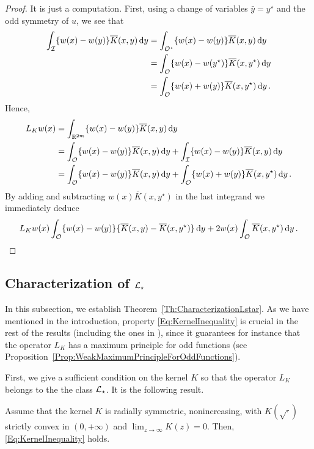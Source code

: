\begin{proof}
	It is just a computation. First,  using a change of variables  $\bar{y} = y^\star$ and the odd symmetry of $u$, we see that
	\begin{align*}
	\int_{\mathcal{I}}  \{w(x) - w(y) \} \overline{K}(x, y)\,\mathrm{d} y &= \int_{\mathcal{O}^\star} \{w(x) - w(y) \}\overline{K}(x, y)\,\mathrm{d} y \\
	&= \int_{\mathcal{O}} \{w(x) - w(y^\star) \}\overline{K}(x, y^\star)\,\mathrm{d} y \\
	&= \int_{\mathcal{O}} \{w(x) + w(y) \}\overline{K}(x, y^\star)\,\mathrm{d} y\,.
	\end{align*}
	Hence,
	\begin{align*}
	L_K w (x) &= \int_{\mathbb{R}^{2m}}  \{w(x) - w(y) \} \overline{K}(x, y)\,\mathrm{d} y \\
	&= \int_{\mathcal{O}}  \{w(x) - w(y) \} \overline{K}(x, y)\,\mathrm{d} y +\int_{\mathcal{I}}  \{w(x) - w(y) \} \overline{K}(x, y)\,\mathrm{d} y \\
	&= \int_{\mathcal{O}} \{w(x) - w(y) \} \overline{K}(x, y) \,\mathrm{d} y +  \int_{\mathcal{O}} \{w(x) + w(y) \} \overline{K}(x, y^\star) \,\mathrm{d} y \,.
	\end{align*}
	By adding and subtracting $w(x)\overline{K}(x, y^\star)$ in the last integrand we immediately deduce
	$$
	L_K w (x) \int_{\mathcal{O}} \{w(x) - w(y) \} \{\overline{K}(x, y) - \overline{K}(x, y^\star)  \} \,\mathrm{d} y +  2 w(x) \int_{\mathcal{O}} \overline{K}(x, y^\star) \,\mathrm{d} y\,.
	$$
\end{proof}

\subsection{Characterization of $\mathcal{L}_\star$}

In this subsection, we establish Theorem~\ref{Th:CharacterizationLstar}. As we have mentioned in the introduction, property \eqref{Eq:KernelInequality} is crucial in the rest of the results (including the ones in \cite{FelipeSanz-Perela:IntegroDifferentialII}), since it guarantees for instance that the operator $L_K$ has a maximum principle for odd functions (see Proposition~\ref{Prop:WeakMaximumPrincipleForOddFunctions}).

First, we give a sufficient condition on the kernel $K$ so that the operator $L_K$ belongs to the the class $\mathcal{L}_\star$. It is the following result.

\begin{proposition}
\label{Prop:KernelInequalitySufficientCondition} Assume that the kernel $K$ is radially symmetric, nonincreasing, with $K(\sqrt{\cdot})$ strictly convex in $(0,+\infty)$ and $\lim_{z\to\infty} K(z) = 0$. Then, \eqref{Eq:KernelInequality} holds.
\end{proposition}

